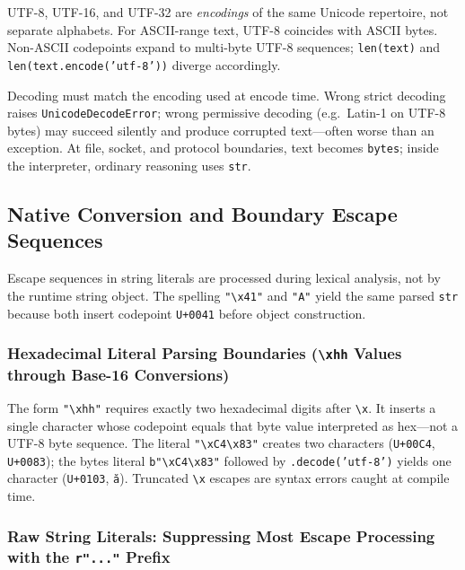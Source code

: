 \documentclass[a4paper,twoside]{report}
\begin{document}
UTF-8, UTF-16, and UTF-32 are \emph{encodings} of the same Unicode repertoire, not separate alphabets. For ASCII-range text, UTF-8 coincides with ASCII bytes. Non-ASCII codepoints expand to multi-byte UTF-8 sequences; \texttt{len(text)} and \texttt{len(text.encode('utf-8'))} diverge accordingly.

Decoding must match the encoding used at encode time. Wrong strict decoding raises \texttt{UnicodeDecodeError}; wrong permissive decoding (e.g.\ Latin-1 on UTF-8 bytes) may succeed silently and produce corrupted text---often worse than an exception. At file, socket, and protocol boundaries, text becomes \texttt{bytes}; inside the interpreter, ordinary reasoning uses \texttt{str}.


\subsection{Native Conversion and Boundary Escape Sequences}

Escape sequences in string literals are processed during lexical analysis, not by the runtime string object. The spelling \texttt{"\textbackslash x41"} and \texttt{"A"} yield the same parsed \texttt{str} because both insert codepoint \texttt{U+0041} before object construction.

\subsubsection{Hexadecimal Literal Parsing Boundaries (\texttt{\textbackslash xhh} Values through Base-16 Conversions)}

The form \texttt{"\textbackslash xhh"} requires exactly two hexadecimal digits after \texttt{\textbackslash x}. It inserts a single character whose codepoint equals that byte value interpreted as hex---not a UTF-8 byte sequence. The literal \texttt{"\textbackslash xC4\textbackslash x83"} creates two characters (\texttt{U+00C4}, \texttt{U+0083}); the bytes literal \texttt{b"\textbackslash xC4\textbackslash x83"} followed by \texttt{.decode('utf-8')} yields one character (\texttt{U+0103}, \texttt{ă}). Truncated \texttt{\textbackslash x} escapes are syntax errors caught at compile time.

\subsubsection{Raw String Literals: Suppressing Most Escape Processing with the \texttt{r"..."} Prefix}
\end{document}
